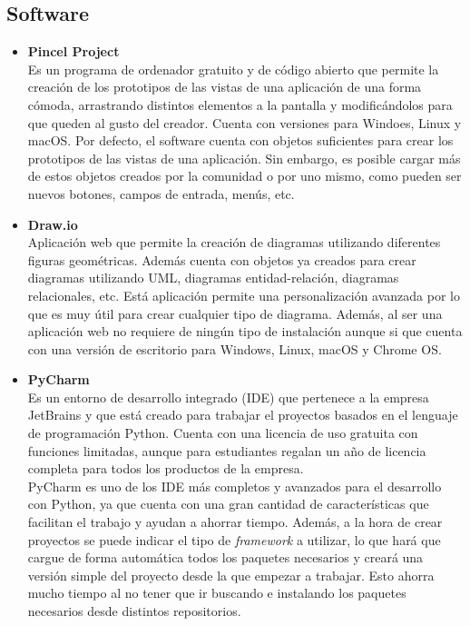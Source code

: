 \subsection{Software}
\begin{itemize}
\item\textbf{Pincel Project}\\
Es un programa de ordenador gratuito y de código abierto que permite la creación de los prototipos de las vistas de una aplicación de una forma cómoda, arrastrando distintos elementos a la pantalla y modificándolos para que queden al gusto del creador. Cuenta con versiones para Windoes, Linux y macOS.
Por defecto, el software cuenta con objetos suficientes para crear los prototipos de las vistas de una aplicación. Sin embargo, es posible cargar más de estos objetos creados por la comunidad o por uno mismo, como pueden ser nuevos botones, campos de entrada, menús, etc.

\item\textbf{Draw.io}\\
Aplicación web que permite la creación de diagramas utilizando diferentes figuras geométricas. Además cuenta con objetos ya creados para crear diagramas utilizando UML, diagramas entidad-relación, diagramas relacionales, etc. Está aplicación permite una personalización avanzada por lo que es muy útil para crear cualquier tipo de diagrama. Además, al ser una aplicación web no requiere de ningún tipo de instalación aunque si que cuenta con una versión de escritorio para Windows, Linux, macOS y Chrome OS.
\item\textbf{PyCharm}\\
Es un entorno de desarrollo integrado (IDE) que pertenece a la empresa JetBrains y que está creado para trabajar el proyectos basados en el lenguaje de programación Python. Cuenta con una licencia de uso gratuita con funciones limitadas, aunque para estudiantes regalan un año de licencia completa para todos los productos de la empresa.\\
PyCharm es uno de los IDE más completos y avanzados para el desarrollo con Python, ya que cuenta con una gran cantidad de características que facilitan el trabajo y ayudan a ahorrar tiempo. Además, a la hora de crear proyectos se puede indicar el tipo de \textit{framework} a utilizar, lo que hará que cargue de forma automática todos los paquetes necesarios y creará una versión simple del proyecto desde la que empezar a trabajar. Esto ahorra mucho tiempo al no tener que ir buscando e instalando los paquetes necesarios desde distintos repositorios. 
\end{itemize}
\subsection{}
